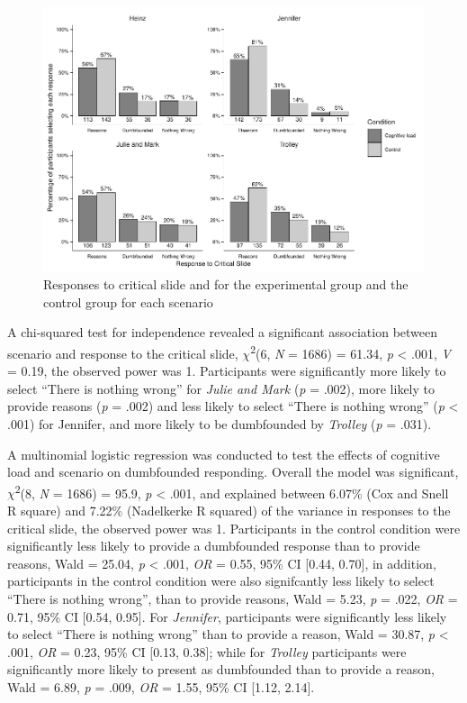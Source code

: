 \documentclass[
  american,
  man,floatsintext]{apa7}
\begin{document}
\begin{figure}
\centering
\includegraphics{cog_load_in_chunks_files/figure-latex/S6ch5S6fig2criticalconditionb-1.pdf}
\caption{\label{fig:S6ch5S6fig2criticalconditionb}Responses to critical slide and for the experimental group and the control group for each scenario}
\end{figure}

A chi-squared test for independence revealed a significant association between scenario and response to the critical slide, \(\chi\)\textsuperscript{2}(6, \emph{N} = 1686) = 61.34, \emph{p} \textless{} .001, \emph{V} = 0.19, the observed power was 1. Participants were significantly more likely to select \enquote{There is nothing wrong} for \emph{Julie and Mark} (\emph{p} = .002), more likely to provide reasons (\emph{p} = .002) and less likely to select \enquote{There is nothing wrong} (\emph{p} \textless{} .001) for Jennifer, and more likely to be dumbfounded by \emph{Trolley} (\emph{p} = .031).

A multinomial logistic regression was conducted to test the effects of cognitive load and scenario on dumbfounded responding. Overall the model was significant, \(\chi\)\textsuperscript{2}(8, \emph{N} = 1686) = 95.9, \emph{p} \textless{} .001, and explained between 6.07\% (Cox and Snell R square) and 7.22\% (Nadelkerke R squared) of the variance in responses to the critical slide, the observed power was 1. Participants in the control condition were significantly less likely to provide a dumbfounded response than to provide reasons, Wald = 25.04, \emph{p} \textless{} .001, \emph{OR} = 0.55, 95\% CI {[}0.44, 0.70{]}, in addition, participants in the control condition were also signifcantly less likely to select \enquote{There is nothing wrong}, than to provide reasons, Wald = 5.23, \emph{p} = .022, \emph{OR} = 0.71, 95\% CI {[}0.54, 0.95{]}. For \emph{Jennifer}, participants were significantly less likely to select \enquote{There is nothing wrong} than to provide a reason, Wald = 30.87, \emph{p} \textless{} .001, \emph{OR} = 0.23, 95\% CI {[}0.13, 0.38{]}; while for \emph{Trolley} participants were significantly more likely to present as dumbfounded than to provide a reason, Wald = 6.89, \emph{p} = .009, \emph{OR} = 1.55, 95\% CI {[}1.12, 2.14{]}.
\end{document}
